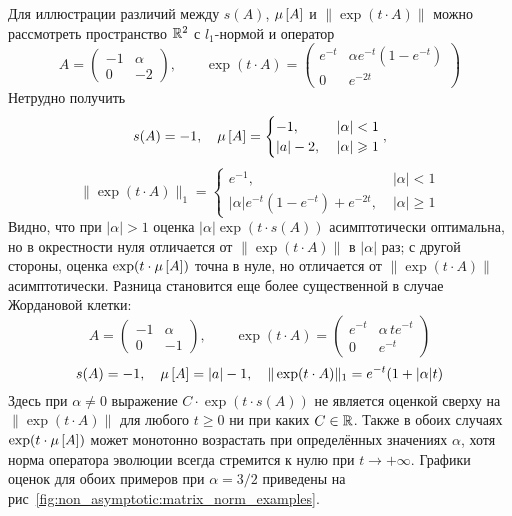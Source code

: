 Для иллюстрации различий между $ s(A) $, $ \mu \left[ A \right] $ и $ \| \exp(t \cdot A) \| $
можно рассмотреть пространство $ \mathbb{R}^2 $ с $ l_1 $-нормой и оператор
\begin{equation}
    \label{eq:non_asymptotic:matrix_1}
    A =
    \begin{pmatrix}
        -1 & \alpha \\
        0 & -2
    \end{pmatrix},
    \qquad
    \exp(t \cdot A) =
    \begin{pmatrix}
        e^{-t} & \alpha e^{-t} (1 - e^{-t}) \\
        0 & e^{-2 t}
    \end{pmatrix}
\end{equation}
Нетрудно получить
\[
    s(A) = -1, \quad
    \mu \left[ A \right] =
    \begin{cases}
        -1, &\; |\alpha| < 1 \\
        |a| - 2, &\; |\alpha| \geqslant 1
    \end{cases},
\]
\[
    \| \exp(t \cdot A) \|_1 =
    \begin{cases}
        e^{-1}, &\; |\alpha| < 1 \\
        |\alpha| e^{-t}(1 - e^{-t}) + e^{-2t}, &\; |\alpha| \geqslant 1
    \end{cases}
\]
Видно, что при $ |\alpha| > 1 $ оценка $ |\alpha| \exp(t \cdot s(A)) $ асимптотически оптимальна,
но в окрестности нуля отличается от $ \| \exp(t \cdot A) \| $ в $ |\alpha| $ раз;
с другой стороны, оценка $ \exp(t \cdot \mu \left[ A \right]) $ точна в нуле,
но отличается от $ \| \exp(t \cdot A) \| $ асимптотически.
Разница становится еще более существенной в случае Жордановой клетки:
\begin{equation}
    \label{eq:non_asymptotic:matrix_2}
    A =
    \begin{pmatrix}
        -1 & \alpha \\
        0 & -1
    \end{pmatrix},
    \qquad
    \exp(t \cdot A) =
    \begin{pmatrix}
        e^{-t} & \alpha \, t e^{-t} \\
        0 & e^{-t}
    \end{pmatrix}
\end{equation}
\[
    s(A) = -1, \quad
    \mu \left[ A \right] = |a| - 1, \quad
    \| \exp(t \cdot A) \|_1 = e^{-t} (1 + |\alpha| t)
\]
Здесь при $ \alpha \neq 0 $ выражение $ C \cdot \exp(t \cdot s(A)) $ не является оценкой сверху на $ \| \exp(t \cdot A) \| $
для любого $ t \geqslant 0 $ ни при каких $ C \in \mathbb{R} $.
Также в обоих случаях $ \exp(t \cdot \mu \left[ A \right]) $ может монотонно возрастать при определённых значениях $ \alpha $,
хотя норма оператора эволюции всегда стремится к нулю при $ t \to +\infty $.
Графики оценок для обоих примеров при $ \alpha = 3/2 $ приведены на рис~\ref{fig:non_asymptotic:matrix_norm_examples}.


